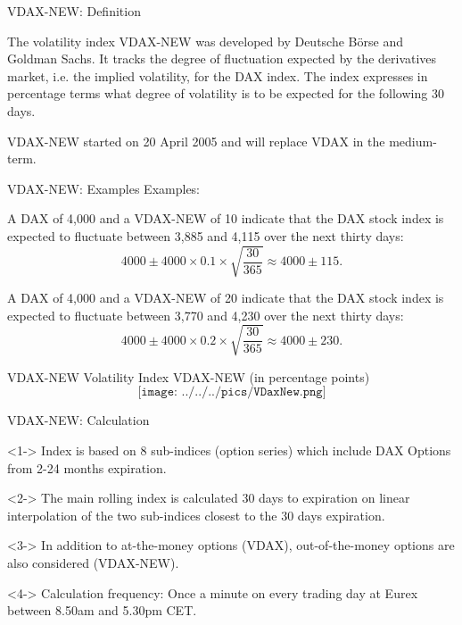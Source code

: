 {VDAX-NEW: Definition}






	The volatility index VDAX-NEW was developed by Deutsche B{\"o}rse and Goldman Sachs. It tracks the degree of fluctuation expected by the derivatives market, i.e. the implied volatility, for the DAX index. The index expresses in percentage terms what degree of volatility is to be expected for the following 30 days.


	VDAX-NEW started on 20 April 2005 and will replace VDAX in the medium-term.





{VDAX-NEW: Examples}
Examples:\\
\vspace{0.3cm}






	A DAX of 4,000 and a VDAX-NEW of 10 indicate that the DAX stock index is expected to fluctuate between 3,885 and 4,115 over the next thirty days:
  $$4000\pm4000\times0.1\times\sqrt{\frac{30}{365}}\approx4000\pm115.$$


	A DAX of 4,000 and a VDAX-NEW of 20 indicate that the DAX stock index is expected to fluctuate between 3,770 and 4,230 over the next thirty days:
    $$4000\pm4000\times0.2\times\sqrt{\frac{30}{365}}\approx4000\pm230.$$





{VDAX-NEW}
Volatility Index VDAX-NEW (in percentage points)
$$\texttt{[image: ../../../pics/VDaxNew.png]}$$

{VDAX-NEW: Calculation}






	<1-> Index is based on 8 sub-indices (option series) which include DAX Options from 2-24 months expiration.


	<2-> The main rolling index is calculated 30 days to expiration on linear interpolation of the two sub-indices closest to the 30 days expiration.


	<3-> In addition to at-the-money options (VDAX), out-of-the-money options are also considered (VDAX-NEW).


	<4-> Calculation frequency: Once a minute on every trading day at Eurex between 8.50am and 5.30pm CET.


